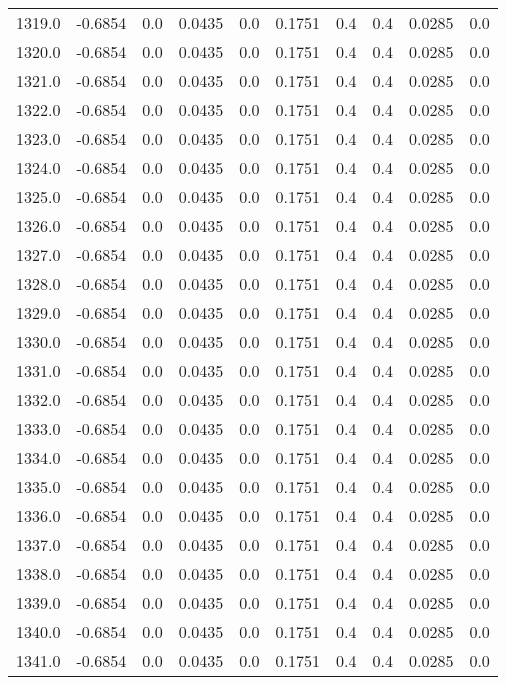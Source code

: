 \begin{longtable}{lrrrrrrrrr}
1319.0 & -0.6854 & 0.0 & 0.0435 & 0.0 & 0.1751 & 0.4 & 0.4 & 0.0285 & 0.0 \\
1320.0 & -0.6854 & 0.0 & 0.0435 & 0.0 & 0.1751 & 0.4 & 0.4 & 0.0285 & 0.0 \\
1321.0 & -0.6854 & 0.0 & 0.0435 & 0.0 & 0.1751 & 0.4 & 0.4 & 0.0285 & 0.0 \\
1322.0 & -0.6854 & 0.0 & 0.0435 & 0.0 & 0.1751 & 0.4 & 0.4 & 0.0285 & 0.0 \\
1323.0 & -0.6854 & 0.0 & 0.0435 & 0.0 & 0.1751 & 0.4 & 0.4 & 0.0285 & 0.0 \\
1324.0 & -0.6854 & 0.0 & 0.0435 & 0.0 & 0.1751 & 0.4 & 0.4 & 0.0285 & 0.0 \\
1325.0 & -0.6854 & 0.0 & 0.0435 & 0.0 & 0.1751 & 0.4 & 0.4 & 0.0285 & 0.0 \\
1326.0 & -0.6854 & 0.0 & 0.0435 & 0.0 & 0.1751 & 0.4 & 0.4 & 0.0285 & 0.0 \\
1327.0 & -0.6854 & 0.0 & 0.0435 & 0.0 & 0.1751 & 0.4 & 0.4 & 0.0285 & 0.0 \\
1328.0 & -0.6854 & 0.0 & 0.0435 & 0.0 & 0.1751 & 0.4 & 0.4 & 0.0285 & 0.0 \\
1329.0 & -0.6854 & 0.0 & 0.0435 & 0.0 & 0.1751 & 0.4 & 0.4 & 0.0285 & 0.0 \\
1330.0 & -0.6854 & 0.0 & 0.0435 & 0.0 & 0.1751 & 0.4 & 0.4 & 0.0285 & 0.0 \\
1331.0 & -0.6854 & 0.0 & 0.0435 & 0.0 & 0.1751 & 0.4 & 0.4 & 0.0285 & 0.0 \\
1332.0 & -0.6854 & 0.0 & 0.0435 & 0.0 & 0.1751 & 0.4 & 0.4 & 0.0285 & 0.0 \\
1333.0 & -0.6854 & 0.0 & 0.0435 & 0.0 & 0.1751 & 0.4 & 0.4 & 0.0285 & 0.0 \\
1334.0 & -0.6854 & 0.0 & 0.0435 & 0.0 & 0.1751 & 0.4 & 0.4 & 0.0285 & 0.0 \\
1335.0 & -0.6854 & 0.0 & 0.0435 & 0.0 & 0.1751 & 0.4 & 0.4 & 0.0285 & 0.0 \\
1336.0 & -0.6854 & 0.0 & 0.0435 & 0.0 & 0.1751 & 0.4 & 0.4 & 0.0285 & 0.0 \\
1337.0 & -0.6854 & 0.0 & 0.0435 & 0.0 & 0.1751 & 0.4 & 0.4 & 0.0285 & 0.0 \\
1338.0 & -0.6854 & 0.0 & 0.0435 & 0.0 & 0.1751 & 0.4 & 0.4 & 0.0285 & 0.0 \\
1339.0 & -0.6854 & 0.0 & 0.0435 & 0.0 & 0.1751 & 0.4 & 0.4 & 0.0285 & 0.0 \\
1340.0 & -0.6854 & 0.0 & 0.0435 & 0.0 & 0.1751 & 0.4 & 0.4 & 0.0285 & 0.0 \\
1341.0 & -0.6854 & 0.0 & 0.0435 & 0.0 & 0.1751 & 0.4 & 0.4 & 0.0285 & 0.0 \\

\end{longtable}
